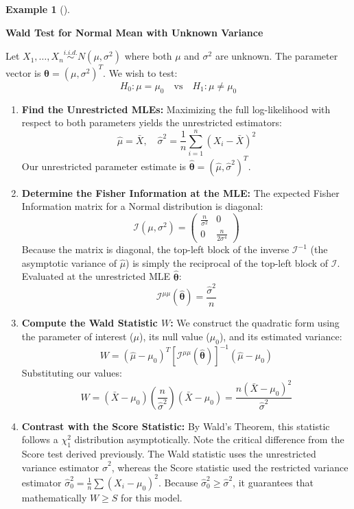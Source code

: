 \documentclass[
  letterpaper,
  DIV=11,
  numbers=noendperiod]{scrreprt}
\renewcommand{\[}{\begin{equation}}
\renewcommand{\]}{\end{equation}}
\theoremstyle{definition}
\theoremstyle{plain}
\theoremstyle{plain}
\theoremstyle{plain}
\theoremstyle{definition}
\newtheorem{example}{Example}[chapter]
\theoremstyle{plain}
\theoremstyle{remark}
\begin{document}
\begin{example}[]\protect\hypertarget{exm-wald-normal}{}\label{exm-wald-normal}

\textbf{Wald Test for Normal Mean with Unknown Variance}

Let \(X_1, \dots, X_n \overset{i.i.d.}{\sim} N(\mu, \sigma^2)\) where
both \(\mu\) and \(\sigma^2\) are unknown. The parameter vector is
\(\boldsymbol{\theta} = (\mu, \sigma^2)^T\). We wish to test:
\[H_0: \mu = \mu_0 \quad \text{vs} \quad H_1: \mu \neq \mu_0\]

\begin{enumerate}
\def\labelenumi{\arabic{enumi}.}
\item
  \textbf{Find the Unrestricted MLEs:} Maximizing the full
  log-likelihood with respect to both parameters yields the unrestricted
  estimators:
  \[\hat{\mu} = \bar{X}, \quad \hat{\sigma}^2 = \frac{1}{n}\sum_{i=1}^n (X_i - \bar{X})^2\]
  Our unrestricted parameter estimate is
  \(\hat{\boldsymbol{\theta}} = (\hat{\mu}, \hat{\sigma}^2)^T\).
\item
  \textbf{Determine the Fisher Information at the MLE:} The expected
  Fisher Information matrix for a Normal distribution is diagonal:
  \[\mathcal{I}(\mu, \sigma^2) = \begin{pmatrix} \frac{n}{\sigma^2} & 0 \\ 0 & \frac{n}{2\sigma^4} \end{pmatrix}\]
  Because the matrix is diagonal, the top-left block of the inverse
  \(\mathcal{I}^{-1}\) (the asymptotic variance of \(\hat{\mu}\)) is
  simply the reciprocal of the top-left block of \(\mathcal{I}\).
  Evaluated at the unrestricted MLE \(\hat{\boldsymbol{\theta}}\):
  \[\mathcal{I}^{\mu\mu}(\hat{\boldsymbol{\theta}}) = \frac{\hat{\sigma}^2}{n}\]
\item
  \textbf{Compute the Wald Statistic \(W\):} We construct the quadratic
  form using the parameter of interest (\(\mu\)), its null value
  (\(\mu_0\)), and its estimated variance:
  \[W = (\hat{\mu} - \mu_0)^T [\mathcal{I}^{\mu\mu}(\hat{\boldsymbol{\theta}})]^{-1} (\hat{\mu} - \mu_0)\]
  Substituting our values:
  \[W = (\bar{X} - \mu_0) \left( \frac{n}{\hat{\sigma}^2} \right) (\bar{X} - \mu_0) = \frac{n(\bar{X} - \mu_0)^2}{\hat{\sigma}^2}\]
\item
  \textbf{Contrast with the Score Statistic:} By Wald's Theorem, this
  statistic follows a \(\chi^2_1\) distribution asymptotically. Note the
  critical difference from the Score test derived previously. The Wald
  statistic uses the unrestricted variance estimator \(\hat{\sigma}^2\),
  whereas the Score statistic used the restricted variance estimator
  \(\hat{\sigma}_0^2 = \frac{1}{n}\sum (X_i - \mu_0)^2\). Because
  \(\hat{\sigma}_0^2 \ge \hat{\sigma}^2\), it guarantees that
  mathematically \(W \ge S\) for this model.
\end{enumerate}

\end{example}
\end{document}
